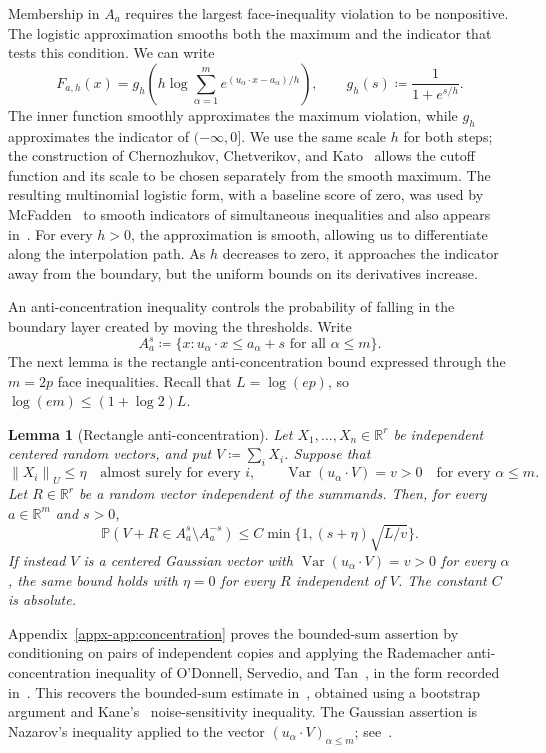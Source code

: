 \documentclass[11pt,letterpaper]{article}
\newtheorem{lemma}{Lemma}
\theoremstyle{remark}
\newcommand{\Pp}{\mathbb P}
\newcommand{\R}{\mathbb R}
\newcommand{\Var}{\operatorname{Var}}
\newcommand{\norm}[1]{\left\lVert#1\right\rVert}
\begin{document}
Membership in \(A_a\) requires the largest face-inequality violation
to be nonpositive. The logistic approximation smooths both the maximum
and the indicator that tests this condition. We can write
\[
 F_{a,h}(x)=g_h\!\left(h\log\sum_{\alpha=1}^m
 e^{(u_\alpha\cdot x-a_\alpha)/h}\right),
 \qquad g_h(s)\coloneqq\frac1{1+e^{s/h}}.
\]
The inner function smoothly approximates the maximum violation, while
\(g_h\) approximates the indicator of \(({-\infty},0]\). We use the
same scale \(h\) for both steps; the construction of Chernozhukov,
Chetverikov, and Kato~\cite{CCK2013} allows the cutoff function and
its scale to be chosen separately from the smooth maximum. The
resulting multinomial logistic form, with a baseline score of zero,
was used by McFadden~\cite[p.~1001]{McFadden1989} to smooth indicators
of simultaneous inequalities and also appears in~\cite[eq.~(5)]{GaoZhang}.
For every \(h>0\), the approximation is smooth, allowing us to
differentiate along the interpolation path. As \(h\) decreases to
zero, it approaches the indicator away from the boundary, but the
uniform bounds on its derivatives increase.

An anti-concentration inequality controls the probability of falling
in the boundary layer created by moving the thresholds. Write
\[
 A_a^s\coloneqq\{x:u_\alpha\cdot x\le a_\alpha+s
                         \text{ for all }\alpha\le m\}.
\]
The next lemma is the rectangle anti-concentration bound expressed
through the \(m=2p\) face inequalities. Recall that \(L=\log(ep)\),
so \(\log(em)\le(1+\log2)L\).
\begin{lemma}[Rectangle anti-concentration]\label{lem:concentration}
Let \(X_1,\ldots,X_n\in\R^r\) be independent centered random
vectors, and put \(V\coloneqq\sum_iX_i\). Suppose that
\[
 \norm{X_i}_U\le\eta\quad\text{almost surely for every }i,
 \qquad \Var(u_\alpha\cdot V)=v>0
                   \quad\text{for every }\alpha\le m.
\]
Let \(R\in\R^r\) be a random vector independent of the summands.
Then, for every \(a\in\R^m\) and \(s>0\),
\[
 \Pp(V+R\in A_a^s\setminus A_a^{-s})
 \le C\min\{1,(s+\eta)\sqrt{L/v}\}.
\]
If instead \(V\) is a centered Gaussian vector with
\(\Var(u_\alpha\cdot V)=v>0\) for every \(\alpha\), the same
bound holds with \(\eta=0\) for every \(R\) independent of \(V\).
The constant \(C\) is absolute.
\end{lemma}
Appendix~\ref{appx-app:concentration} proves the bounded-sum assertion
by conditioning on pairs of independent copies and applying the
Rademacher anti-concentration inequality of O'Donnell, Servedio,
and Tan~\cite{OST}, in the form recorded
in~\cite[Lemma~J.4]{CCKK2022}. This recovers the bounded-sum estimate
in~\cite[Lemma~2.1]{AL}, obtained using a bootstrap argument and
Kane's~\cite{Kane} noise-sensitivity inequality. The Gaussian assertion
is Nazarov's inequality applied to the vector
\((u_\alpha\cdot V)_{\alpha\le m}\);
see~\cite[Lemma~A.1]{CCK2017}.
\end{document}
